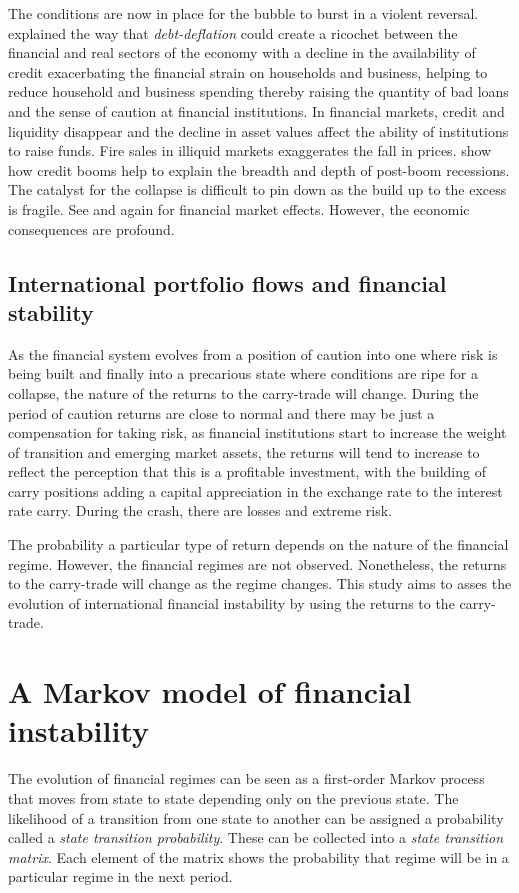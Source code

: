 \documentclass[12pt, a4paper, oneside]{article} %
\begin{document}
The conditions are now in place for the bubble to burst in a violent reversal.  \citet{FisherBD, FisherDD} explained the way that \emph{debt-deflation} could create a ricochet between the financial and real sectors of the economy with a decline in the availability of credit exacerbating the financial strain on households and business, helping to reduce household and business spending thereby raising the quantity of bad loans and the sense of caution at financial institutions. In financial markets, credit and liquidity disappear and the decline in asset values affect the ability of institutions to raise funds.  Fire sales in illiquid markets exaggerates the fall in prices. \citet{ReinhartRogoff} show how credit booms help to explain the breadth and depth of post-boom recessions.  The catalyst for the collapse is difficult to pin down as the build up to the excess is fragile.  See \citet{Gorton2013} and \citet{BrunnermeierLiquidity} again for financial market effects. However, the economic consequences are profound.  


\subsection{International portfolio flows and financial stability}
As the financial system evolves from a position of caution into one where risk is being built and finally into a precarious state where conditions are ripe for a collapse, the nature of the returns to the carry-trade will change. During the period of caution returns are close to normal and there may be just a compensation for taking risk, as financial institutions start to increase the weight of transition and emerging market assets, the returns will tend to increase to reflect the perception that this is a profitable investment, with the building of carry positions adding a capital appreciation in the exchange rate to the interest rate carry. During the crash, there are losses and extreme risk.   

The probability a particular type of return depends on the nature of the financial regime.   However, the financial regimes are not observed.  Nonetheless, the returns to the carry-trade will change as the regime changes. This study aims to asses the evolution of international financial instability by using the returns to the carry-trade. 

\section{A Markov model of financial instability}
The evolution of financial regimes can be seen as a first-order Markov process that moves from state to state depending only on the previous state.  The likelihood of a transition from one state to another can be assigned a probability called a \emph{state transition probability}.  These can be collected into a \emph{state transition matrix}. Each element of the matrix shows the probability that regime will be in a particular regime in the next period. 
\end{document}
